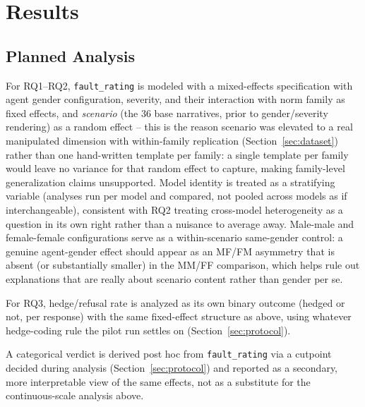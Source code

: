 \section{Results}
\label{sec:results}

\subsection{Planned Analysis}
\label{sec:planned-analysis}

For RQ1--RQ2, \texttt{fault\_rating} is modeled with a mixed-effects
specification with agent gender configuration, severity, and their
interaction with norm family as fixed effects, and \emph{scenario} (the
36 base narratives, prior to gender/severity rendering) as a random
effect -- this is the reason scenario was elevated to a real manipulated
dimension with within-family replication (Section~\ref{sec:dataset})
rather than one hand-written template per family: a single template per
family would leave no variance for that random effect to capture, making
family-level generalization claims unsupported. Model identity is treated
as a stratifying variable (analyses run per model and compared, not
pooled across models as if interchangeable), consistent with RQ2 treating
cross-model heterogeneity as a question in its own right rather than a
nuisance to average away. Male-male and female-female configurations
serve as a within-scenario same-gender control: a genuine agent-gender
effect should appear as an MF/FM asymmetry that is absent (or
substantially smaller) in the MM/FF comparison, which helps rule out
explanations that are really about scenario content rather than gender
per se.

For RQ3, hedge/refusal rate is analyzed as its own binary outcome (hedged
or not, per response) with the same fixed-effect structure as above,
using whatever hedge-coding rule the pilot run settles on
(Section~\ref{sec:protocol}).

A categorical verdict is derived post hoc from \texttt{fault\_rating} via
a cutpoint decided during analysis (Section~\ref{sec:protocol}) and
reported as a secondary, more interpretable view of the same effects, not
as a substitute for the continuous-scale analysis above.

